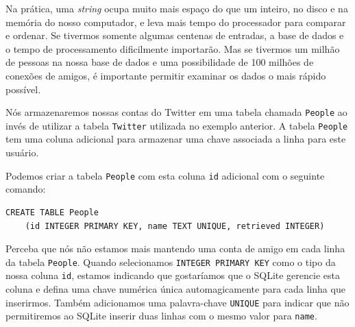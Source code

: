 Na prática, uma {\it string} ocupa muito mais espaço do que um inteiro, no
disco e na memória do nosso computador, e leva mais tempo do processador para
comparar e ordenar. Se tivermos somente algumas centenas de entradas, a base
de dados e o tempo de processamento dificilmente importarão. Mas se tivermos
um milhão de pessoas na nossa base de dados e uma possibilidade de 100 milhões
de conexões de amigos, é importante permitir examinar os dados o mais rápido
possível.


Nós armazenaremos nossas contas do Twitter em uma tabela chamada {\tt People}
ao invés de utilizar a tabela {\tt Twitter} utilizada no exemplo anterior. A
tabela {\tt People} tem uma coluna adicional para armazenar uma chave associada
a linha para este usuário.


Podemos criar a tabela {\tt People} com esta coluna {\tt id} adicional com o
seguinte comando:

\beforeverb
\begin{verbatim}
CREATE TABLE People 
    (id INTEGER PRIMARY KEY, name TEXT UNIQUE, retrieved INTEGER)
\end{verbatim}
\afterverb
%
%
Perceba que nós não estamos mais mantendo uma conta de amigo em cada linha da
tabela {\tt People}. Quando selecionamos {\tt INTEGER PRIMARY KEY} como o tipo
da nossa coluna {\tt id}, estamos indicando que gostaríamos que o SQLite
gerencie esta coluna e defina uma chave numérica única automagicamente para
cada linha que inserirmos. Também adicionamos uma palavra-chave {\tt UNIQUE}
para indicar que não permitiremos ao SQLite inserir duas linhas com o mesmo
valor para {\tt name}.

